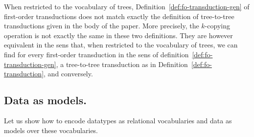 When restricted to the vocabulary of trees, Definition~\ref{def:fo-transduction-gen} of first-order transductions does not match exactly the definition of tree-to-tree transductions given in the body of the paper. More precisely, the $k$-copying operation is not exactly the same in these two definitions. They are however equivalent in the sens that, when restricted to the vocabulary of trees, we can find for every first-order transduction in the sens of definition~\ref{def:fo-transduction-gen}, a tree-to-tree transduction as in Definition~\ref{def:fo-transduction}, and conversely.
 
\subsection{Data as models.}\label{sec:data-as-models}
Let us show how to encode datatypes as relational vocabularies and data as models over these vocabularies. 
